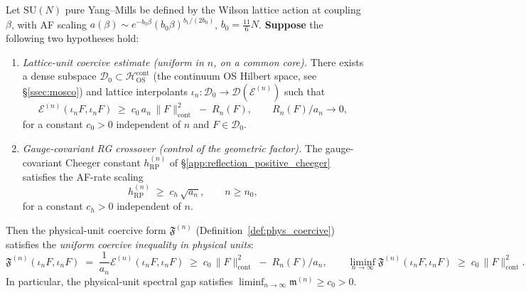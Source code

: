 \begin{theorem}
\label{thm:rg_crossover}
Let $\mathrm{SU}(N)$ pure Yang--Mills be defined by the Wilson
lattice action at coupling $\beta$, with AF scaling
$a(\beta)\sim e^{-b_{0}\beta}(b_{0}\beta)^{b_{1}/(2b_{0})}$,
$b_{0}=\tfrac{11}{6}N$.
\textbf{Suppose} the following two hypotheses hold:
\begin{enumerate}
\item[\textbf{(C1)}] \emph{Lattice-unit coercive estimate
(uniform in $n$, on a common core).} There exists a dense subspace
$\mathcal{D}_{0}\subset\mathcal{H}_{\mathrm{OS}}^{\mathrm{cont}}$
(the continuum OS Hilbert space, see \S\ref{ssec:mosco}) and
lattice interpolants $\iota_{n}:\mathcal{D}_{0}\to
\mathcal{D}(\mathcal{E}^{(n)})$ such that
\begin{equation}
\label{eq:C1}
  \mathcal{E}^{(n)}(\iota_{n}F,\iota_{n}F)
  \;\ge\;c_{0}\,a_{n}\,\|F\|_{\mathrm{cont}}^{2}
  \;-\;R_{n}(F),
  \qquad
  R_{n}(F)/a_{n}\to 0,
\end{equation}
for a constant $c_{0}>0$ independent of $n$ and $F\in\mathcal{D}_{0}$.
\item[\textbf{(C2)}] \emph{Gauge-covariant RG crossover
(control of the geometric factor).} The gauge-covariant Cheeger
constant $h_{\mathrm{RP}}^{(n)}$ of
\S\ref{app:reflection_positive_cheeger} satisfies the AF-rate
scaling
\begin{equation}
\label{eq:C2}
  h_{\mathrm{RP}}^{(n)}
  \;\ge\;c_{h}\,\sqrt{a_{n}},
  \qquad n\ge n_{0},
\end{equation}
for a constant $c_{h}>0$ independent of $n$.
\end{enumerate}
Then the physical-unit coercive form
$\mathfrak{F}^{(n)}$ (Definition~\ref{def:phys_coercive}) satisfies
the \emph{uniform coercive inequality in physical units}:
\begin{equation}
\label{eq:rg_crossover_conclusion}
  \mathfrak{F}^{(n)}(\iota_{n}F,\iota_{n}F)
  \;=\;\frac{1}{a_{n}}\mathcal{E}^{(n)}(\iota_{n}F,\iota_{n}F)
  \;\ge\;c_{0}\,\|F\|_{\mathrm{cont}}^{2}
  \;-\;R_{n}(F)/a_{n},
  \qquad
  \liminf_{n\to\infty}\mathfrak{F}^{(n)}(\iota_{n}F,\iota_{n}F)
  \;\ge\;c_{0}\,\|F\|_{\mathrm{cont}}^{2}.
\end{equation}
In particular, the physical-unit spectral gap satisfies
$\liminf_{n\to\infty}\mathfrak{m}^{(n)}\ge c_{0}>0$.
\end{theorem}

